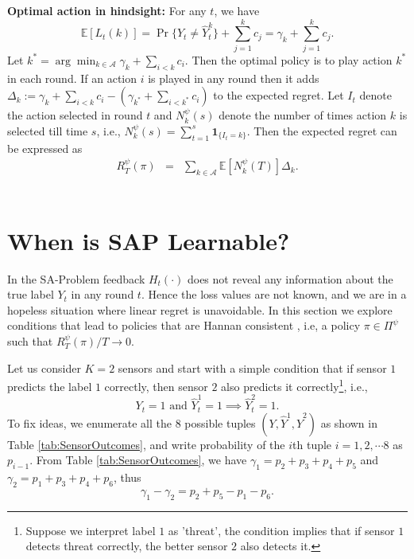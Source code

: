 \documentclass{article}
\begin{document}
\noindent
{\bf Optimal action in hindsight: } For any $t$, we have 
\begin{equation}
\label{eqn:OptimalAction}
\mathbb{E}[L_t(k)]=\Pr\{Y_t\neq \hat{Y}^k_t\}+\sum_{j=1}^kc_j=\gamma_k +\sum_{j=1}^kc_j.
\end{equation}
Let $k^*=\arg\min_{k\in \mathcal{A}} \gamma_k + \sum_{i< k}c_i$. Then the optimal policy is to play action $k^*$ in each round. If an action $i$ is played in any round then it adds   $\Delta_k:=\gamma_k + \sum_{i<k}c_i -( \gamma_{k^*} + \sum_{i<k^*}c_i)$ to the expected regret. Let $I_t$ denote the action selected in round $t$ and $N^\psi_k(s)$ denote the number of times action $k$ is selected till time $s$, i.e., $N^\psi_k(s)=\sum_{t=1}^s \boldsymbol{1}_{\{I_t=k\}}$. Then the expected regret can be expressed as
\begin{eqnarray}
\label{eqn:ExpRegretGap}
R^\psi_T(\pi)&=& \sum_{k \in \mathcal{A}}\mathbb{E}[N_k^\psi(T)]\Delta_k.
\end{eqnarray}\


\section{When is SAP Learnable?}
In the SA-Problem feedback $H_t(\cdot)$ does not reveal any information about the true label $Y_t$ in any round $t$. Hence the loss values are not known, and we are in a hopeless situation where linear regret is unavoidable. In this section we explore conditions that lead to policies that are Hannan consistent \cite{Hannan1957_HannanConsistency_Hannan}, i.e, a policy $\pi\in \Pi^\psi$ such that $R_T^\psi (\pi)/T \rightarrow 0$.

Let us consider $K=2$ sensors and start with a simple condition that if sensor $1$ predicts the label $1$ correctly, then sensor $2$ also predicts it correctly\footnote{Suppose we interpret label $1$ as 'threat', the condition implies that if sensor $1$ detects threat correctly, the better sensor $2$ also detects it. }, i.e.,
\begin{equation}
\label{eqn:PathDominace1} 
Y_t=1 \mbox{ and } \hat{Y}_t^1=1 \implies \hat{Y}^2_t=1. 
\end{equation}
To fix ideas, we enumerate all the $8$ possible tuples $(Y, \hat{Y}^1, \hat{Y}^2)$ as shown in Table \ref{tab:SensorOutcomes}, and write probability of the $i$th tuple $i=1,2,\cdots 8$ as $p_{i-1}$.  From Table \ref{tab:SensorOutcomes}, we have  $\gamma_1=p_2+p_3+p_4+p_5$ and $\gamma_2=p_1+p_3+p_4+p_6$, thus
\begin{equation}
	\gamma_1-\gamma_2 = p_2+p_5-p_1-p_6.
\end{equation}
\end{document}
